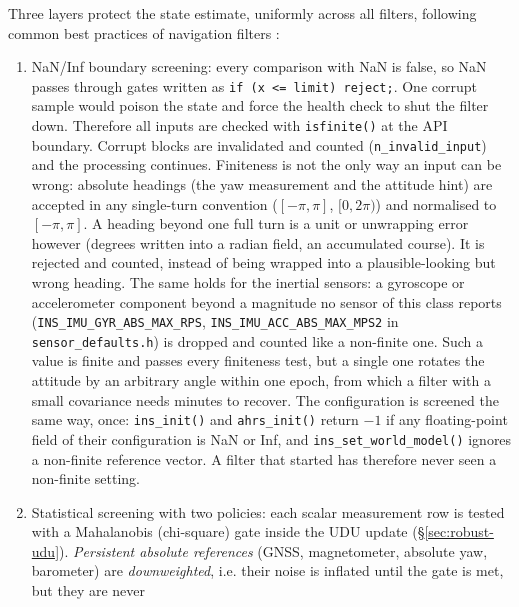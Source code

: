 \documentclass[11pt,a4paper]{article}
\newcommand{\code}[1]{\texttt{#1}}
\begin{document}
Three layers protect the state estimate, uniformly across all filters,
following common best practices of navigation filters \cite{carpenter2018}:

\begin{enumerate}
  \item NaN/Inf boundary screening: every comparison with NaN is false, so NaN
        passes through gates written as \code{if (x <= limit) reject;}. One
        corrupt sample would poison the state and force the health check to
        shut the filter down. Therefore all inputs are checked with
        \code{isfinite()} at the API boundary. Corrupt blocks are invalidated
        and counted (\code{n\_\allowbreak{}invalid\_\allowbreak{}input}) and the
        processing continues. Finiteness is not the only way an input can be
        wrong: absolute headings (the yaw measurement and the attitude hint) are
        accepted in any single-turn convention ($[-\pi,\pi]$, $[0,2\pi)$) and
        normalised to $[-\pi,\pi]$. A heading beyond one full turn is a unit or
        unwrapping error however (degrees written into a radian field, an
        accumulated course). It is rejected and counted, instead of being
        wrapped into a plausible-looking but wrong heading. The same holds for
        the inertial sensors: a gyroscope or accelerometer component beyond a
        magnitude no sensor of this class reports
        (\code{INS\_IMU\_GYR\_ABS\_MAX\_RPS}, \code{INS\_IMU\_ACC\_ABS\_MAX\_MPS2} in
        \code{sensor\_defaults.h}) is dropped and counted like a non-finite one.
        Such a value is finite and passes every finiteness test, but a single one
        rotates the attitude by an arbitrary angle within one epoch, from which a
        filter with a small covariance needs minutes to recover.
        The configuration is screened the same way, once:
        \code{ins\_\allowbreak{}init()} and \code{ahrs\_\allowbreak{}init()} return
        $-1$ if any floating-point field of their configuration is NaN or Inf,
        and \code{ins\_\allowbreak{}set\_\allowbreak{}world\_\allowbreak{}model()}
        ignores a non-finite reference vector. A filter that started has
        therefore never seen a non-finite setting.
  \item Statistical screening with two policies: each scalar measurement row is
        tested with a Mahalanobis (chi-square) gate inside the UDU update
        (\S\ref{sec:robust-udu}). \emph{Persistent absolute references} (GNSS,
        magnetometer, absolute yaw, barometer) are \emph{downweighted}, i.e.
        their noise is inflated until the gate is met, but they are never

\end{enumerate}
\end{document}
